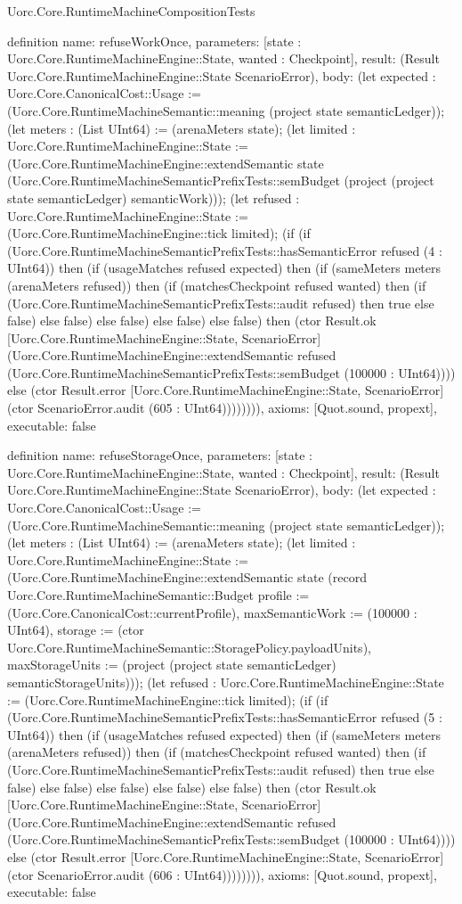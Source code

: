 \begin{lexlean}{Uorc.Core.RuntimeMachineCompositionTests}
\begin{semanticmodule}
definition{
  name: refuseWorkOnce,
  parameters: [state : Uorc.Core.RuntimeMachineEngine::State, wanted : Checkpoint],
  result: (Result Uorc.Core.RuntimeMachineEngine::State ScenarioError),
  body: (let expected : Uorc.Core.CanonicalCost::Usage := (Uorc.Core.RuntimeMachineSemantic::meaning (project state semanticLedger)); (let meters : (List UInt64) := (arenaMeters state); (let limited : Uorc.Core.RuntimeMachineEngine::State := (Uorc.Core.RuntimeMachineEngine::extendSemantic state (Uorc.Core.RuntimeMachineSemanticPrefixTests::semBudget (project (project state semanticLedger) semanticWork))); (let refused : Uorc.Core.RuntimeMachineEngine::State := (Uorc.Core.RuntimeMachineEngine::tick limited); (if (if (Uorc.Core.RuntimeMachineSemanticPrefixTests::hasSemanticError refused (4 : UInt64)) then (if (usageMatches refused expected) then (if (sameMeters meters (arenaMeters refused)) then (if (matchesCheckpoint refused wanted) then (if (Uorc.Core.RuntimeMachineSemanticPrefixTests::audit refused) then true else false) else false) else false) else false) else false) then (ctor Result.ok [Uorc.Core.RuntimeMachineEngine::State, ScenarioError] (Uorc.Core.RuntimeMachineEngine::extendSemantic refused (Uorc.Core.RuntimeMachineSemanticPrefixTests::semBudget (100000 : UInt64)))) else (ctor Result.error [Uorc.Core.RuntimeMachineEngine::State, ScenarioError] (ctor ScenarioError.audit (605 : UInt64)))))))),
  axioms: [Quot.sound, propext],
  executable: false
}

definition{
  name: refuseStorageOnce,
  parameters: [state : Uorc.Core.RuntimeMachineEngine::State, wanted : Checkpoint],
  result: (Result Uorc.Core.RuntimeMachineEngine::State ScenarioError),
  body: (let expected : Uorc.Core.CanonicalCost::Usage := (Uorc.Core.RuntimeMachineSemantic::meaning (project state semanticLedger)); (let meters : (List UInt64) := (arenaMeters state); (let limited : Uorc.Core.RuntimeMachineEngine::State := (Uorc.Core.RuntimeMachineEngine::extendSemantic state (record Uorc.Core.RuntimeMachineSemantic::Budget {profile := (Uorc.Core.CanonicalCost::currentProfile), maxSemanticWork := (100000 : UInt64), storage := (ctor Uorc.Core.RuntimeMachineSemantic::StoragePolicy.payloadUnits), maxStorageUnits := (project (project state semanticLedger) semanticStorageUnits)})); (let refused : Uorc.Core.RuntimeMachineEngine::State := (Uorc.Core.RuntimeMachineEngine::tick limited); (if (if (Uorc.Core.RuntimeMachineSemanticPrefixTests::hasSemanticError refused (5 : UInt64)) then (if (usageMatches refused expected) then (if (sameMeters meters (arenaMeters refused)) then (if (matchesCheckpoint refused wanted) then (if (Uorc.Core.RuntimeMachineSemanticPrefixTests::audit refused) then true else false) else false) else false) else false) else false) then (ctor Result.ok [Uorc.Core.RuntimeMachineEngine::State, ScenarioError] (Uorc.Core.RuntimeMachineEngine::extendSemantic refused (Uorc.Core.RuntimeMachineSemanticPrefixTests::semBudget (100000 : UInt64)))) else (ctor Result.error [Uorc.Core.RuntimeMachineEngine::State, ScenarioError] (ctor ScenarioError.audit (606 : UInt64)))))))),
  axioms: [Quot.sound, propext],
  executable: false
}


\end{semanticmodule}
\end{lexlean}
